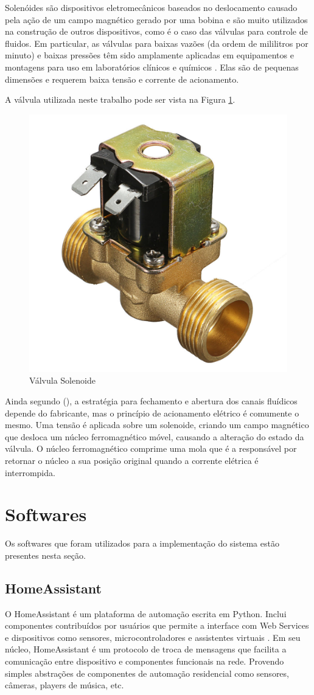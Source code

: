 Solenóides são dispositivos eletromecânicos baseados no deslocamento causado pela ação de um campo magnético gerado por uma bobina e são muito utilizados na construção de outros dispositivos, como é o caso das válvulas para controle de fluidos. Em particular, as válvulas para baixas vazões (da ordem de mililitros por minuto) e baixas pressões têm sido amplamente aplicadas em equipamentos e montagens para uso em laboratórios clínicos e químicos  \cite{da2002modulo}. Elas são de pequenas dimensões e requerem baixa tensão e corrente de acionamento.

A válvula utilizada neste trabalho pode ser vista na Figura \ref{fig:valvula-solenoide}.

\begin{figure}[htbp]
	\centering
	\includegraphics[width=0.3\linewidth]{figuras/valvula-solenoide.jpg}
	\caption{Válvula Solenoide}
	\label{fig:valvula-solenoide}
\end{figure}

Ainda segundo \citeauthor{da2002modulo} (\citeyear{da2002modulo}), a estratégia para fechamento e abertura dos canais fluídicos depende do fabricante, mas o princípio de acionamento elétrico é comumente o mesmo. Uma tensão é aplicada sobre um solenoide, criando um campo magnético que desloca um núcleo ferromagnético móvel, causando a alteração do estado da válvula. O núcleo
ferromagnético comprime uma mola que é a responsável por retornar o núcleo a sua posição original quando a corrente elétrica é interrompida.

\section{Softwares}

Os softwares que foram utilizados para a implementação do sistema estão presentes nesta seção.

\subsection{HomeAssistant}

O HomeAssistant é um plataforma de automação escrita em Python. Inclui componentes contribuídos por usuários que permite a interface com Web Services e dispositivos como sensores, microcontroladores e assistentes virtuais \cite{Lundrigan2017}. Em seu núcleo, HomeAssistant é um protocolo de troca de mensagens que facilita a comunicação entre dispositivo e componentes funcionais na rede. Provendo simples abstrações de componentes de automação residencial como sensores, câmeras, players de música, etc.

